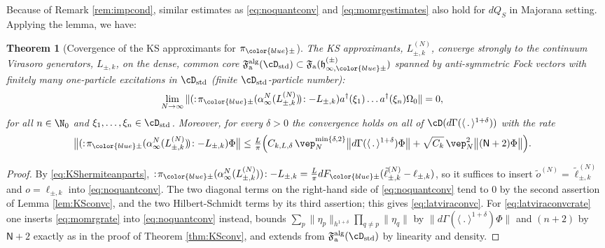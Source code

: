 \documentclass[a4paper, 11pt]{article}
\newcommand{\ua}{\textup a}
\newcommand{\fF}{\mathfrak{F}}\newcommand{\cF}{\mathcal{F}}\newcommand{\dF}{\mathds{F}}\newcommand{\sF}{\mathscr{F}}
\newcommand{\fh}{\mathfrak{h}}
\DeclareMathOperator{\1}{\mathds{1}}
\DeclareMathOperator{\std}{std}
\DeclareMathOperator{\alg}{alg}
\newtheorem{thm}{Theorem} [section]
\newcommand{\Nop}{\mathsf{N}}
\begin{document}
Because of Remark \ref{rem:impcond}, similar estimates as \eqref{eq:noquantconv} and \eqref{eq:momrgestimates} also hold for $dQ_{S}$ in Majorana setting. Applying the lemma, we have:
\begin{thm}[Covergence of the KS approximants for $\pi_{{\color{blue}\pm}}$]
\label{thm:KSconvc}
The KS approximants, $L^{(N)}_{\pm,k}$, converge strongly to the continuum Virasoro generators, $L_{\pm,k}$, on the dense, common core $\fF^{\alg}_{\ua}(\cD_{\std})\subset\fF_{\ua}(\fh^{(\pm)}_{\infty,{\color{blue}\pm}})$ spanned by anti-symmetric Fock vectors with finitely many one-particle excitations in $\cD_{\std}$ (finite $\cD_{\std}$-particle number):
\begin{align}
\label{eq:latviraconvc}
\lim_{N\rightarrow\infty}\|(:\!\pi_{{\color{blue}\pm}}(\alpha^{N}_{\infty}(L^{(N)}_{\pm,k})\!)\!: - L_{\pm,k})a^{\dagger}(\xi_{1})\dots a^{\dagger}(\xi_{n})\Omega_{0}\| & = 0,
\end{align}
for all $n\in\N_{0}$ and $\xi_{1},\dots,\xi_{n}\in\cD_{\std}$. Moreover, for every $\delta>0$ the convergence holds on all of $\cD(d\Gamma(\langle\!\ .\!\ \rangle^{1+\delta}))$ with the rate
\begin{align}
\label{eq:latviraconvcrate}
\big\|(:\!\pi_{{\color{blue}\pm}}(\alpha^{N}_{\infty}(L^{(N)}_{\pm,k})\!)\!: - L_{\pm,k})\Phi\big\| & \leq \tfrac{L}{\pi}\Big(C_{k,L,\delta}\!\ \vep_{N}^{\min\{\delta,2\}}\big\|d\Gamma(\langle\!\ .\!\ \rangle^{1+\delta})\Phi\big\| + \sqrt{C_{k}}\!\ \vep_{N}^{2}\big\|(\Nop+2)\Phi\big\|\Big).
\end{align}
\end{thm}
\begin{proof}
By \eqref{eq:KShermiteanparts}, $:\!\pi_{{\color{blue}\pm}}(\alpha^{N}_{\infty}(L^{(N)}_{\pm,k}))\!:-L_{\pm,k} = \tfrac{L}{\pi}dF_{{\color{blue}\pm}}(\tilde{\ell}^{(N)}_{\pm,k}-\ell_{\pm,k})$, so it suffices to insert $\tilde{o}^{(N)} = \tilde{\ell}^{(N)}_{\pm,k}$ and $o = \ell_{\pm,k}$ into \eqref{eq:noquantconv}. The two diagonal terms on the right-hand side of \eqref{eq:noquantconv} tend to $0$ by the second assertion of Lemma \ref{lem:KSconvc}, and the two Hilbert-Schmidt terms by its third assertion; this gives \eqref{eq:latviraconvc}. For \eqref{eq:latviraconvcrate} one inserts \eqref{eq:momrgrate} into \eqref{eq:noquantconv} instead, bounds $\sum_{p}\|\eta_{p}\|_{h^{1+\delta}}\prod_{q\neq p}\|\eta_{q}\|$ by $\|d\Gamma(\langle\!\ .\!\ \rangle^{1+\delta})\Phi\|$ and $(n+2)$ by $\Nop+2$ exactly as in the proof of Theorem \ref{thm:KSconv}, and extends from $\fF^{\alg}_{\ua}(\cD_{\std})$ by linearity and density.
\end{proof}
\end{document}
